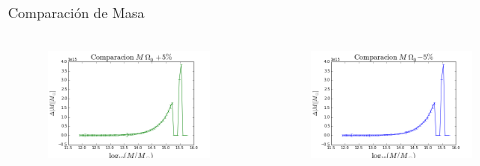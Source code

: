 \documentclass{beamer}
\begin{document}
\begin{frame}{Comparación de Masa}
	\begin{columns}
		\begin{column}{0.5\textwidth}
			\begin{figure}[!h]
			\begin{center}
				\includegraphics[width=\textwidth]{im/logm-deltam-mas}
				\label{fig:m1}
			\end{center}
		\end{figure}
		\end{column}
		
		\begin{column}{0.5\textwidth}
			\begin{figure}[!h]
			\begin{center}
				\includegraphics[width=\textwidth]{im/logm-deltam-menos}
				\label{fig:m2}
			\end{center}
		\end{figure}
		\end{column}
	\end{columns}
\end{frame}
\end{document}
